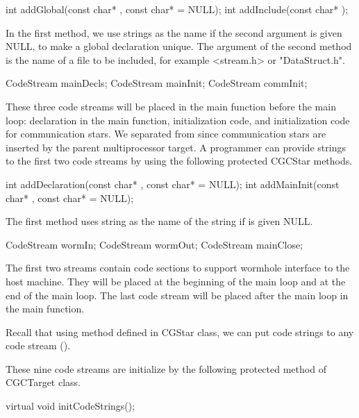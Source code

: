 {\begin{example}
int addGlobal(const char* , const char*  = NULL);
int addInclude(const char* );
\end{example}

In the first method, we use  strings as the name if the second
argument is given NULL, to make a global declaration unique.
The argument of the second method is the name of a file to be included, for
example <stream.h> or "DataStruct.h".

\begin{example}
CodeStream mainDecls;
CodeStream mainInit;
CodeStream commInit;
\end{example}

These three code streams will be placed in the main function before the
main loop: declaration in the main function, initialization code, and
initialization code for communication stars. We separated 
from  since communication stars are inserted by the parent
multiprocessor target.
A programmer can provide strings to the first
two code streams by using the following protected CGCStar methods.

\begin{example}
int addDeclaration(const char* , const char*  = NULL);
int addMainInit(const char* , const char*  = NULL);
\end{example}

The first method uses  string as the name of the string if
 is given NULL.

\begin{example}
CodeStream wormIn;
CodeStream wormOut;
CodeStream mainClose;
\end{example}

The first two streams contain code sections to support wormhole interface
to the host machine. They will be placed at the beginning of the main loop and
at the end of the main loop. The last code stream will be placed after the
main loop in the main function.

Recall that using  method defined in CGStar class, we can
put code strings to any code stream ().

These nine code streams are initialize by the following protected method
of CGCTarget class.

\begin{example}
virtual void initCodeStrings();
\end{example}

}
